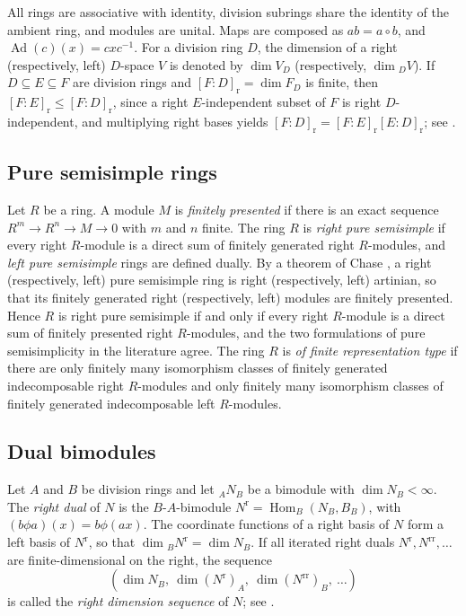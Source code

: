 \documentclass[11pt,a4paper]{amsart}
\numberwithin{equation}{section}
\newcommand{\Ad}{\operatorname{Ad}}
\newcommand{\Hom}{\operatorname{Hom}}
\newcommand{\rr}{\mathrm{r}}
\begin{document}
All rings are associative with identity, division subrings share the identity of the ambient ring, and modules are unital. Maps are composed as $ab=a\circ b$, and $\Ad(c)(x)=cxc^{-1}$. For a division ring $D$, the dimension of a right (respectively, left) $D$-space $V$ is denoted by $\dim V_D$ (respectively, $\dim{}_DV$). If $D\subseteq E\subseteq F$ are division rings and $[F:D]_{\rr}=\dim F_D$ is finite, then $[F:E]_{\rr}\le[F:D]_{\rr}$, since a right $E$-independent subset of $F$ is right $D$-independent, and multiplying right bases yields $[F:D]_{\rr}=[F:E]_{\rr}[E:D]_{\rr}$; see \cite{Co}.

\subsection{Pure semisimple rings}

Let $R$ be a ring. A module $M$ is \emph{finitely presented} if there is an exact sequence $R^m\to R^n\to M\to0$ with $m$ and $n$ finite. The ring $R$ is \emph{right pure semisimple} if every right $R$-module is a direct sum of finitely generated right $R$-modules, and \emph{left pure semisimple} rings are defined dually. By a theorem of Chase \cite{Ch}, a right (respectively, left) pure semisimple ring is right (respectively, left) artinian, so that its finitely generated right (respectively, left) modules are finitely presented. Hence $R$ is right pure semisimple if and only if every right $R$-module is a direct sum of finitely presented right $R$-modules, and the two formulations of pure semisimplicity in the literature agree. The ring $R$ is \emph{of finite representation type} if there are only finitely many isomorphism classes of finitely generated indecomposable right $R$-modules and only finitely many isomorphism classes of finitely generated indecomposable left $R$-modules.

\subsection{Dual bimodules}

Let $A$ and $B$ be division rings and let ${}_AN_B$ be a bimodule with $\dim N_B<\infty$. The \emph{right dual} of $N$ is the $B$-$A$-bimodule $N^{\rr}=\Hom_B(N_B,B_B)$, with $(b\phi a)(x)=b\phi(ax)$. The coordinate functions of a right basis of $N$ form a left basis of $N^{\rr}$, so that $\dim{}_BN^{\rr}=\dim N_B$. If all iterated right duals $N^{\rr},N^{\rr\rr},\dots$ are finite-dimensional on the right, the sequence
\[
(\dim N_B,\ \dim(N^{\rr})_A,\ \dim(N^{\rr\rr})_B,\ \dots)
\]
is called the \emph{right dimension sequence} of $N$; see \cite{Si97,Sa}.
\end{document}
